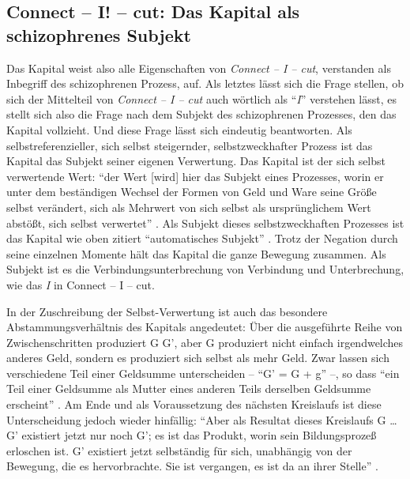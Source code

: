 \documentclass[12pt,
               paper=a4,
               twoside=false,
               onehalfspacing,
               bibliography=totoc,
               toc=graduated,
               ]{scrartcl}
\newcommand{\pc}[2]{\parencite[#1]{#2}}
\newcommand{\cic}{Connect -- I -- cut\xspace}
\begin{document}


\subsection{Connect -- I! -- cut: Das Kapital als schizophrenes Subjekt}

Das Kapital weist also alle Eigenschaften von \emph{\cic}, verstanden
als Inbegriff des schizophrenen Prozess, auf. Als letztes lässt sich
die Frage stellen, ob sich der Mittelteil von \emph{\cic} auch
wörtlich als "`\emph{I}"' verstehen lässt, es stellt sich also die
Frage nach dem Subjekt des schizophrenen Prozesses, den das Kapital
vollzieht. Und diese Frage lässt sich eindeutig beantworten. Als
selbstreferenzieller, sich selbst steigernder, selbstzweckhafter
Prozess ist das Kapital das Subjekt seiner eigenen Verwertung. Das
Kapital ist der sich selbst verwertende Wert: "`der Wert [wird] hier
das Subjekt eines Prozesses, worin er unter dem beständigen Wechsel
der Formen von Geld und Ware seine Größe selbst verändert, sich als
Mehrwert von sich selbst als ursprünglichem Wert abstößt, sich selbst
verwertet"' \pc{169}{kap}. Als Subjekt dieses selbstzweckhaften
Prozesses ist das Kapital wie oben zitiert "`automatisches Subjekt"'
\pc{169}{kap}. Trotz der Negation durch seine einzelnen Momente hält
das Kapital die ganze Bewegung zusammen. Als Subjekt ist es die
Verbindungsunterbrechung von Verbindung und Unterbrechung, wie das
\emph{I} in \cic.

In der Zuschreibung der Selbst-Verwertung ist auch das besondere \glq
Abstammungsverhältnis\grq{} des Kapitals angedeutet: Über die
ausgeführte Reihe von Zwischenschritten \glq produziert\grq{} G G',
aber G \glq produziert\grq{} nicht einfach irgendwelches anderes Geld,
sondern es produziert sich selbst als mehr Geld. Zwar lassen sich
verschiedene Teil einer Geldsumme unterscheiden -- "`G' = G + g"'
\pc{51}{kap2} --, so dass "`ein Teil einer Geldsumme als Mutter eines
anderen Teils derselben Geldsumme erscheint"' \pc{55}{kap2}. Am Ende
und als Voraussetzung des nächsten Kreislaufs ist diese Unterscheidung
jedoch wieder hinfällig: "`Aber als Resultat dieses Kreislaufs G \dots
G' existiert jetzt nur noch G'; es ist das Produkt, worin sein
Bildungsprozeß erloschen ist. G' existiert jetzt selbständig für sich,
unabhängig von der Bewegung, die es hervorbrachte. Sie ist vergangen,
es ist da an ihrer Stelle"' \pc{49}{kap2}.
\end{document}
